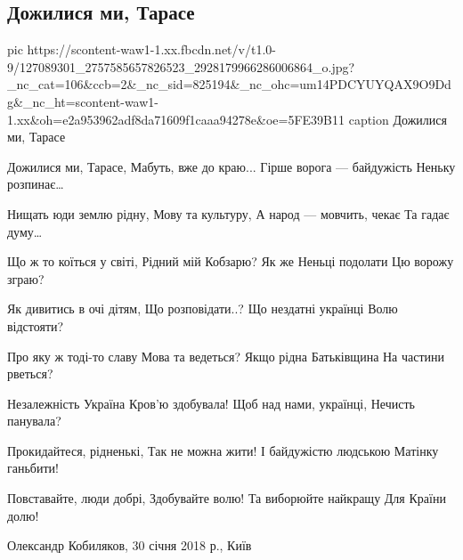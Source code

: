  
 
 
 
 
 
\subsection{Дожилися ми, Тарасе}
\label{sec:24_11_2020.fb.kobyljakov_oleksandr.1.taras}

\ifcmt
pic https://scontent-waw1-1.xx.fbcdn.net/v/t1.0-9/127089301_2757585657826523_2928179966286006864_o.jpg?_nc_cat=106&ccb=2&_nc_sid=825194&_nc_ohc=um14PDCYUYQAX9O9Ddg&_nc_ht=scontent-waw1-1.xx&oh=e2a953962adf8da71609f1caaa94278e&oe=5FE39B11
caption Дожилися ми, Тарасе
\fi

Дожилися ми, Тарасе,
Мабуть, вже до краю...
Гірше ворога --- байдужість
Неньку розпинає…

Нищать юди землю рідну,
Мову та культуру,
А народ --- мовчить, чекає
Та гадає думу…

Що ж то коїться у світі,
Рідний мій Кобзарю?
Як же Неньці подолати
Цю ворожу зграю?

Як дивитись в очі дітям,
Що розповідати..?
Що нездатні українці
Волю відстояти?

Про яку ж тоді-то славу
Мова та ведеться?
Якщо рідна Батьківщина
На частини рветься?

Незалежність Україна
Кров’ю здобувала!
Щоб над нами, українці,
Нечисть панувала?

Прокидайтеся, рідненькі,
Так не можна жити!
І байдужістю людською
Матінку ганьбити!

Повставайте, люди добрі,
Здобувайте волю!
Та виборюйте найкращу
Для Країни долю!

Олександр Кобиляков, 30 січня 2018 р., Київ
